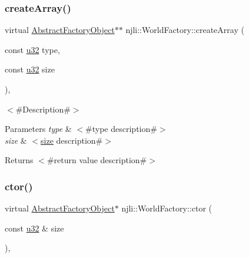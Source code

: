 \subsubsection{\texorpdfstring{create\+Array()}{createArray()}}
{\footnotesize\ttfamily virtual \mbox{\hyperlink{classnjli_1_1_abstract_factory_object}{Abstract\+Factory\+Object}}$\ast$$\ast$ njli\+::\+World\+Factory\+::create\+Array (\begin{DoxyParamCaption}\item[{const \mbox{\hyperlink{_util_8h_a10e94b422ef0c20dcdec20d31a1f5049}{u32}}}]{type,  }\item[{const \mbox{\hyperlink{_util_8h_a10e94b422ef0c20dcdec20d31a1f5049}{u32}}}]{size }\end{DoxyParamCaption})\hspace{0.3cm}{\ttfamily [protected]}, {\ttfamily [virtual]}}

$<$\#\+Description\#$>$


\begin{DoxyParams}{Parameters}
{\em type} & $<$\#type description\#$>$ \\
\hline
{\em size} & $<$\mbox{\hyperlink{classnjli_1_1_world_factory_ad5d3fc4509c0939fd64f5d8473e915d2}{size}} description\#$>$\\
\hline
\end{DoxyParams}
\begin{DoxyReturn}{Returns}
$<$\#return value description\#$>$ 
\end{DoxyReturn}
\mbox{\label{classnjli_1_1_world_factory_a20a56f43a616363546d43fc1e90c6f08}} 
\subsubsection{\texorpdfstring{ctor()}{ctor()}\hspace{0.1cm}{\footnotesize\ttfamily [1/4]}}
{\footnotesize\ttfamily virtual \mbox{\hyperlink{classnjli_1_1_abstract_factory_object}{Abstract\+Factory\+Object}}$\ast$ njli\+::\+World\+Factory\+::ctor (\begin{DoxyParamCaption}\item[{const \mbox{\hyperlink{_util_8h_a10e94b422ef0c20dcdec20d31a1f5049}{u32}} \&}]{size }\end{DoxyParamCaption})\hspace{0.3cm}{\ttfamily [protected]}, {\ttfamily [virtual]}}



